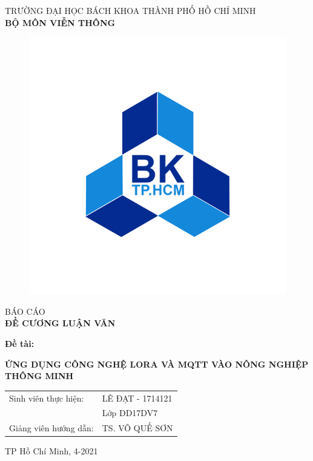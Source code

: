 \documentclass[13pt,a4paper]{article}
\begin{document}
\begin{titlepage}

\begin{center}
\vspace{-6pt} TRƯỜNG ĐẠI HỌC BÁCH KHOA THÀNH PHỐ HỒ CHÍ MINH\\
\textbf{\fontsize{16pt}{0pt}\selectfont BỘ MÔN VIỄN THÔNG}
\vspace{0.5cm}
\begin{figure}[H]
	\centering
	\includegraphics[scale=.30]{image/bachkhoa.png}
\end{figure}
\vspace{0.5cm}
\fontsize{24pt}{0pt}\selectfont BÁO CÁO\\
\vspace{12pt}
\textbf{\fontsize{32pt}{0pt}\selectfont ĐỀ CƯƠNG LUẬN VĂN}
\vspace{1cm} 
\end{center}
\textbf{\fontsize{14pt}{0pt}\selectfont Đề tài:}
\begin{center}
	\textbf{\fontsize{20pt}{0pt}\selectfont ỨNG DỤNG CÔNG NGHỆ LORA VÀ MQTT VÀO NÔNG NGHIỆP THÔNG MINH}\\
\vspace{1.5cm}
\begin{table}[H]
	\centering
	\begin{tabular}{l l}
	\fontsize{14pt}{0pt}\selectfont Sinh viên thực hiện:  &\fontsize{14pt}{0pt}\selectfont LÊ ĐẠT - 1714121 \vspace{6pt}\\
	& Lớp DD17DV7 \vspace{6pt} \\
	\fontsize{14pt}{0pt}\selectfont Giảng viên hướng dẫn:  &\fontsize{14pt}{0pt}\selectfont TS. VÕ QUẾ SƠN\\
	\end{tabular}
\end{table}
\vspace{2cm}
\fontsize{14pt}{0pt}\selectfont TP Hồ Chí Minh, 4-2021
\end{center}
\end{titlepage}
\end{document}
